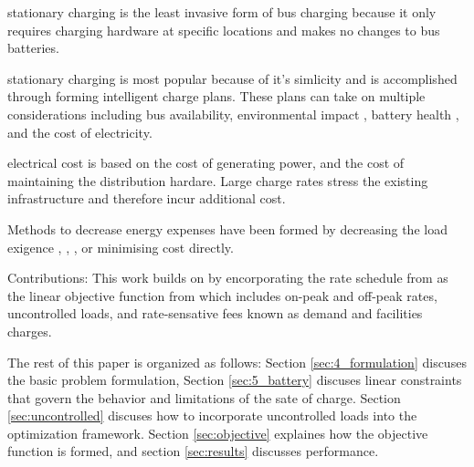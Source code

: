 \par stationary charging is the least invasive form of bus charging because it only requires charging hardware at specific locations and makes no changes to bus batteries. 
\par stationary charging is most popular because of it's simlicity and is accomplished through forming intelligent charge plans. These plans can take on multiple considerations including bus availability, environmental impact \cite{zhou_bi-objective_2021}, battery health \cite{houbbadi_optimal_2019}, and the cost of electricity.
\par electrical cost is based on the cost of generating power, and the cost of maintaining the distribution hardare. Large charge rates stress the existing infrastructure and therefore incur additional cost.
\par Methods to decrease energy expenses have been formed by decreasing the load exigence \cite{cheng_smart_2020}, \cite{ojer_development_2020}, \cite{qin_numerical_2016}, \cite{bagherinezhad_spatio-temporal_2020} or minimising cost directly.
\par Contributions: This work builds on \cite{brown_position_nodate} by encorporating the rate schedule from \cite{rocky_mountain_power_rocky_2021} as the linear objective function from \cite{mortensen_comprehensive_2021} which includes on-peak and off-peak rates, uncontrolled loads, and rate-sensative fees known as demand and facilities charges.  
\par The rest of this paper is organized as follows: Section \ref{sec:4_formulation} discuses the basic problem formulation, Section \ref{sec:5_battery} discuses linear constraints that govern the behavior and limitations of the sate of charge. Section \ref{sec:uncontrolled} discuses how to incorporate uncontrolled loads into the optimization framework. Section \ref{sec:objective} explaines how the objective function is formed, and section \ref{sec:results} discusses performance.
